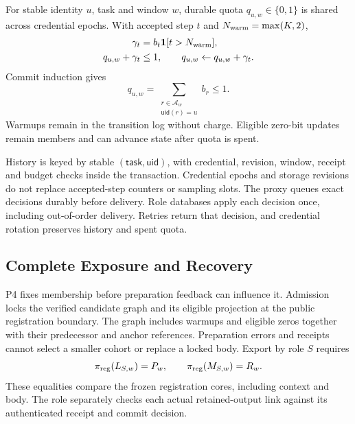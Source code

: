 \documentclass[conference,compsoc]{IEEEtran}
\theoremstyle{definition}
\numberwithin{equation}{section}
\numberwithin{table}{section}
\numberwithin{figure}{section}
\theoremstyle{plain}
\begin{document}
For stable identity \(u\), task and window \(w\), durable quota
\(q_{u,w}\in\{0,1\}\) is shared across credential epochs. With accepted step
\(t\) and \(N_{\rm warm}=\max(K,2)\),
\begin{equation}
\begin{aligned}
\gamma_t&=b_t\mathbf1[t>N_{\rm warm}],\\
q_{u,w}+\gamma_t&\le1,\qquad
q_{u,w}\gets q_{u,w}+\gamma_t.
\end{aligned}
\label{eq:window-quota}
\end{equation}
Commit induction gives
\begin{equation}
q_{u,w}=\sum_{\substack{r\in\mathcal A_w\\\mathsf{uid}(r)=u}} b_r\le1.
\label{eq:quota-invariant}
\end{equation}
Warmups remain in the transition log without charge. Eligible zero-bit updates
remain members and can advance state after quota is spent.

History is keyed by stable \((\mathsf{task},\mathsf{uid})\), with credential,
revision, window, receipt and budget checks inside the transaction. Credential
epochs and storage revisions do not replace accepted-step counters or sampling
slots. The proxy
queues exact decisions durably before delivery. Role databases apply each
decision once, including out-of-order delivery. Retries return that decision,
and credential rotation preserves history and spent quota.

\subsection{Complete Exposure and Recovery}
\label{sec:finalization}
\label{sec:strict-choice}
P4 fixes membership before preparation feedback can influence it. Admission
locks the verified candidate graph and its eligible projection at the public
registration boundary. The graph includes warmups and eligible zeros together
with their predecessor and anchor references. Preparation errors and receipts cannot select a smaller cohort or replace
a locked body. Export by role \(S\) requires
\begin{equation}
 \pi_{\rm reg}(L_{S,w})=P_w,\qquad \pi_{\rm reg}(M_{S,w})=R_w.
 \label{eq:final-report-set}
\end{equation}
These equalities compare the frozen registration cores, including context and
body. The role separately checks each actual retained-output link against its
authenticated receipt and commit decision.
\end{document}
